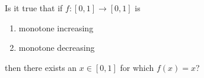 \documentclass{article}
\begin{document}
\setlength{\parindent}{0pt}
Is it true that if $f:[0,1]\to[0,1]$ is
\begin{enumerate}[label=\alph*)]
\item monotone increasing
\item monotone decreasing
\end{enumerate}
then there exists an $x\in[0,1]$ for which $f(x)=x$?
\end{document}
